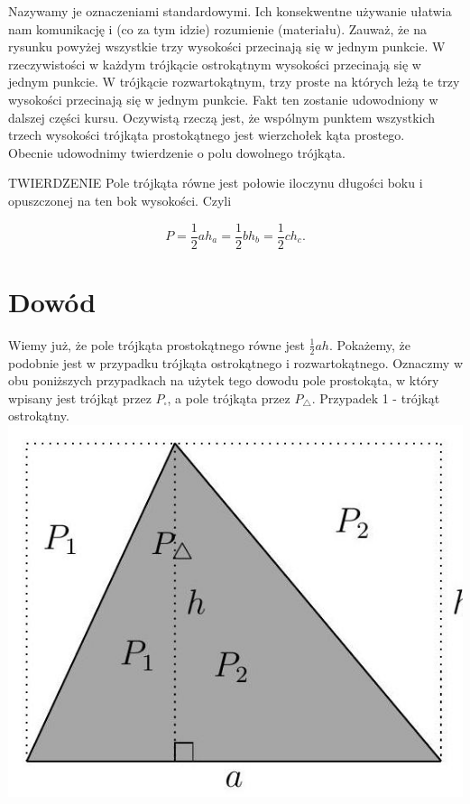 \documentclass[10pt]{article}
\begin{document}
Nazywamy je oznaczeniami standardowymi. Ich konsekwentne używanie ułatwia nam komunikację i (co za tym idzie) rozumienie (materiału). Zauważ, że na rysunku powyżej wszystkie trzy wysokości przecinają się w jednym punkcie. W rzeczywistości w każdym trójkącie ostrokątnym wysokości przecinają się w jednym punkcie. W trójkącie rozwartokątnym, trzy proste na których leżą te trzy wysokości przecinają się w jednym punkcie. Fakt ten zostanie udowodniony w dalszej części kursu. Oczywistą rzeczą jest, że wspólnym punktem wszystkich trzech wysokości trójkąta prostokątnego jest wierzchołek kąta prostego.\\
Obecnie udowodnimy twierdzenie o polu dowolnego trójkąta.

TWIERDZENIE Pole trójkąta równe jest połowie iloczynu długości boku i opuszczonej na ten bok wysokości. Czyli

\[
P=\frac{1}{2} a h_{a}=\frac{1}{2} b h_{b}=\frac{1}{2} c h_{c} .
\]

\section*{Dowód}
Wiemy już, że pole trójkąta prostokątnego równe jest \(\frac{1}{2} a h\). Pokażemy, że podobnie jest w przypadku trójkąta ostrokątnego i rozwartokątnego. Oznaczmy w obu poniższych przypadkach na użytek tego dowodu pole prostokąta, w który wpisany jest trójkąt przez \(P_{\square}\), a pole trójkąta przez \(P_{\triangle}\). Przypadek 1 - trójkąt ostrokątny.\\
\includegraphics[max width=\textwidth, center]{2024_11_21_71f62bd117d375398909g-031}
\end{document}
